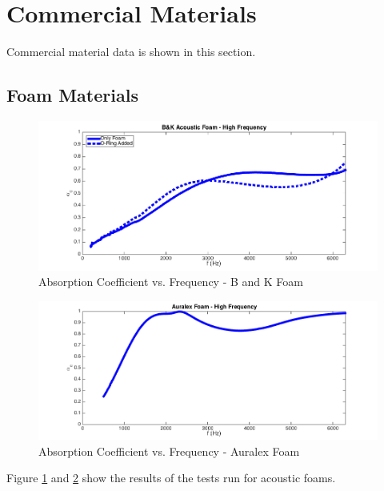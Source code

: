 \section{Commercial Materials}
Commercial material data is shown in this section.

\subsection{Foam Materials}
\begin{figure}[hbtp]
    \centering
    \includegraphics[width=1\textwidth]{Chapter-4/figs/AfigBKfoam}
    \caption{Absorption Coefficient vs. Frequency - B and K Foam}
    \label{fig:AfigBKfoam}
\end{figure}

\begin{figure}[hbtp]
    \centering
    \includegraphics[width=1\textwidth]{Chapter-4/figs/AuralexFoam}
    \caption{Absorption Coefficient vs. Frequency - Auralex Foam}
    \label{fig:AuralexFoam}
\end{figure}
\clearpage

Figure \ref{fig:AfigBKfoam} and \ref{fig:AuralexFoam} show the results of the tests run for acoustic foams.

